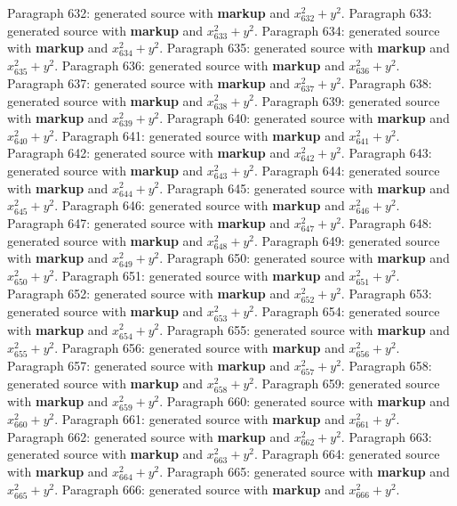 \documentclass{article}
\begin{document}
Paragraph 632: generated source with \textbf{markup} and $x_{632}^2 + y^2$.
Paragraph 633: generated source with \textbf{markup} and $x_{633}^2 + y^2$.
Paragraph 634: generated source with \textbf{markup} and $x_{634}^2 + y^2$.
Paragraph 635: generated source with \textbf{markup} and $x_{635}^2 + y^2$.
Paragraph 636: generated source with \textbf{markup} and $x_{636}^2 + y^2$.
Paragraph 637: generated source with \textbf{markup} and $x_{637}^2 + y^2$.
Paragraph 638: generated source with \textbf{markup} and $x_{638}^2 + y^2$.
Paragraph 639: generated source with \textbf{markup} and $x_{639}^2 + y^2$.
Paragraph 640: generated source with \textbf{markup} and $x_{640}^2 + y^2$.
Paragraph 641: generated source with \textbf{markup} and $x_{641}^2 + y^2$.
Paragraph 642: generated source with \textbf{markup} and $x_{642}^2 + y^2$.
Paragraph 643: generated source with \textbf{markup} and $x_{643}^2 + y^2$.
Paragraph 644: generated source with \textbf{markup} and $x_{644}^2 + y^2$.
Paragraph 645: generated source with \textbf{markup} and $x_{645}^2 + y^2$.
Paragraph 646: generated source with \textbf{markup} and $x_{646}^2 + y^2$.
Paragraph 647: generated source with \textbf{markup} and $x_{647}^2 + y^2$.
Paragraph 648: generated source with \textbf{markup} and $x_{648}^2 + y^2$.
Paragraph 649: generated source with \textbf{markup} and $x_{649}^2 + y^2$.
Paragraph 650: generated source with \textbf{markup} and $x_{650}^2 + y^2$.
Paragraph 651: generated source with \textbf{markup} and $x_{651}^2 + y^2$.
Paragraph 652: generated source with \textbf{markup} and $x_{652}^2 + y^2$.
Paragraph 653: generated source with \textbf{markup} and $x_{653}^2 + y^2$.
Paragraph 654: generated source with \textbf{markup} and $x_{654}^2 + y^2$.
Paragraph 655: generated source with \textbf{markup} and $x_{655}^2 + y^2$.
Paragraph 656: generated source with \textbf{markup} and $x_{656}^2 + y^2$.
Paragraph 657: generated source with \textbf{markup} and $x_{657}^2 + y^2$.
Paragraph 658: generated source with \textbf{markup} and $x_{658}^2 + y^2$.
Paragraph 659: generated source with \textbf{markup} and $x_{659}^2 + y^2$.
Paragraph 660: generated source with \textbf{markup} and $x_{660}^2 + y^2$.
Paragraph 661: generated source with \textbf{markup} and $x_{661}^2 + y^2$.
Paragraph 662: generated source with \textbf{markup} and $x_{662}^2 + y^2$.
Paragraph 663: generated source with \textbf{markup} and $x_{663}^2 + y^2$.
Paragraph 664: generated source with \textbf{markup} and $x_{664}^2 + y^2$.
Paragraph 665: generated source with \textbf{markup} and $x_{665}^2 + y^2$.
Paragraph 666: generated source with \textbf{markup} and $x_{666}^2 + y^2$.
\end{document}
